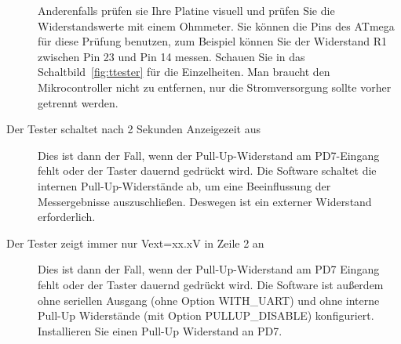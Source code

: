\begin{description}
Anderenfalls prüfen sie Ihre Platine visuell und prüfen Sie die Widerstandswerte
mit einem Ohmmeter. Sie können die Pins des ATmega für diese Prüfung benutzen,
zum Beispiel können Sie der Widerstand R1 zwischen Pin 23 und Pin 14 messen.
Schauen Sie in das Schaltbild~\ref{fig:ttester} für die Einzelheiten.
Man braucht den Mikrocontroller nicht zu entfernen, nur die Stromversorgung sollte
vorher getrennt werden.

\item[Der Tester schaltet nach 2 Sekunden Anzeigezeit aus]  
Dies ist dann der Fall, wenn der Pull-Up-Widerstand am PD7-Eingang
fehlt oder der Taster dauernd gedrückt wird. 
Die Software schaltet die internen Pull-Up-Widerstände ab, um eine Beeinflussung
der Messergebnisse auszuschließen. Deswegen ist ein externer Widerstand erforderlich.

\item[Der Tester zeigt immer nur Vext=xx.xV in Zeile 2 an]
Dies ist dann der Fall, wenn der Pull-Up-Widerstand am PD7 Eingang
fehlt oder der Taster dauernd gedrückt wird.
Die Software ist außerdem ohne seriellen Ausgang (ohne Option WITH\_UART) und
ohne interne Pull-Up Widerstände (mit Option PULLUP\_DISABLE) konfiguriert.
Installieren Sie einen Pull-Up Widerstand an PD7.

\end{description}
